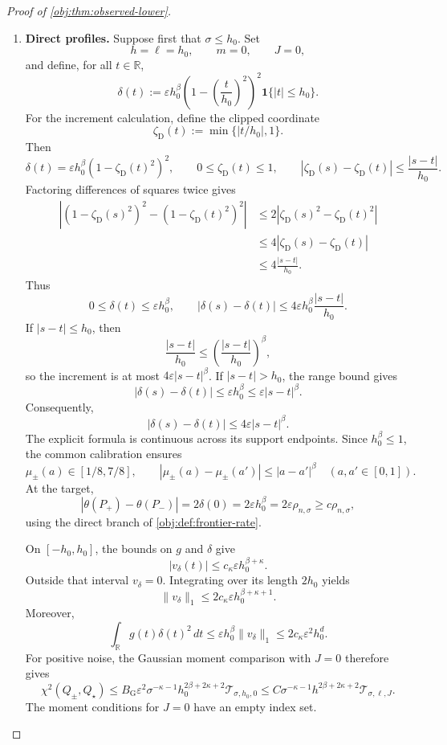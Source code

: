 \documentclass[11pt]{article}
\begin{document}
\begin{proof}[Proof of \cref{obj:thm:observed-lower}]
\begin{enumerate}
\item \textbf{Direct profiles.}
Suppose first that \(\sigma\le h_0\). Set
\[
h=\ell=h_0,\qquad m=0,\qquad J=0,
\]
and define, for all \(t\in\mathbb R\),
\[
\delta(t):=
\varepsilon h_0^\beta
\left(1-\left(\frac{t}{h_0}\right)^2\right)^2
\mathbf1\{|t|\le h_0\}.
\]
For the increment calculation, define the clipped coordinate
\[
\zeta_{\mathrm D}(t):=\min\{|t/h_0|,1\}.
\]
Then
\[
\delta(t)=\varepsilon h_0^\beta
(1-\zeta_{\mathrm D}(t)^2)^2,
\qquad
0\le\zeta_{\mathrm D}(t)\le1,
\qquad
|\zeta_{\mathrm D}(s)-\zeta_{\mathrm D}(t)|
\le\frac{|s-t|}{h_0}.
\]
Factoring differences of squares twice gives
\[
\begin{aligned}
\left|(1-\zeta_{\mathrm D}(s)^2)^2
-(1-\zeta_{\mathrm D}(t)^2)^2\right|
&\le2|\zeta_{\mathrm D}(s)^2-\zeta_{\mathrm D}(t)^2|\\
&\le4|\zeta_{\mathrm D}(s)-\zeta_{\mathrm D}(t)|\\
&\le4\frac{|s-t|}{h_0}.
\end{aligned}
\]
Thus
\[
0\le\delta(t)\le\varepsilon h_0^\beta,\qquad
|\delta(s)-\delta(t)|
\le4\varepsilon h_0^\beta\frac{|s-t|}{h_0}.
\]
If \(|s-t|\le h_0\), then
\[
\frac{|s-t|}{h_0}
\le\left(\frac{|s-t|}{h_0}\right)^\beta,
\]
so the increment is at most \(4\varepsilon|s-t|^\beta\). If \(|s-t|>h_0\), the range bound gives
\[
|\delta(s)-\delta(t)|
\le\varepsilon h_0^\beta
\le\varepsilon|s-t|^\beta.
\]
Consequently,
\[
|\delta(s)-\delta(t)|\le4\varepsilon|s-t|^\beta.
\]
The explicit formula is continuous across its support endpoints. Since \(h_0^\beta\le1\), the common calibration ensures
\[
\mu_\pm(a)\in[1/8,7/8],\qquad
|\mu_\pm(a)-\mu_\pm(a')|\le|a-a'|^\beta
\quad(a,a'\in[0,1]).
\]
At the target,
\[
|\theta(P_+)-\theta(P_-)|
=2\delta(0)=2\varepsilon h_0^\beta
=2\varepsilon\rho_{n,\sigma}
\ge c\rho_{n,\sigma},
\]
using the direct branch of \cref{obj:def:frontier-rate}.

On \([-h_0,h_0]\), the bounds on \(g\) and \(\delta\) give
\[
|v_\delta(t)|\le c_\kappa\varepsilon h_0^{\beta+\kappa}.
\]
Outside that interval \(v_\delta=0\). Integrating over its length \(2h_0\) yields
\[
\|v_\delta\|_1
\le2c_\kappa\varepsilon h_0^{\beta+\kappa+1}.
\]
Moreover,
\[
\int_{\mathbb R}g(t)\delta(t)^2\,dt
\le\varepsilon h_0^\beta\|v_\delta\|_1
\le2c_\kappa\varepsilon^2h_0^d.
\]
For positive noise, the Gaussian moment comparison with \(J=0\) therefore gives
\[
\chi^2(Q_\pm,Q_\star)
\le
B_{\mathrm G}\varepsilon^2
\sigma^{-\kappa-1}h_0^{2\beta+2\kappa+2}
\mathcal T_{\sigma,h_0,0}
\le
C\sigma^{-\kappa-1}h^{2\beta+2\kappa+2}
\mathcal T_{\sigma,\ell,J}.
\]
The moment conditions for \(J=0\) have an empty index set.


\end{enumerate}
\end{proof}
\end{document}

